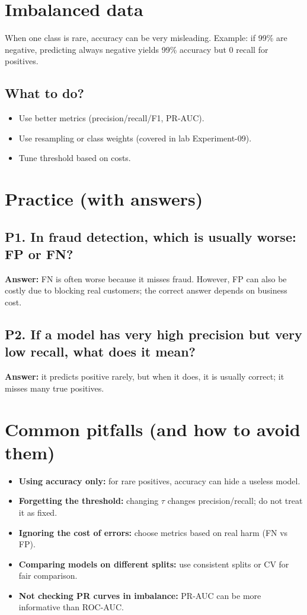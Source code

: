 \documentclass[11pt]{article}
\begin{document}
\section{Imbalanced data}
When one class is rare, accuracy can be very misleading.
Example: if 99\% are negative, predicting always negative yields 99\% accuracy but 0 recall for positives.

\subsection{What to do?}
\begin{itemize}[leftmargin=*]
  \item Use better metrics (precision/recall/F1, PR-AUC).
  \item Use resampling or class weights (covered in lab Experiment-09).
  \item Tune threshold based on costs.
\end{itemize}

\section{Practice (with answers)}
\subsection*{P1. In fraud detection, which is usually worse: FP or FN?}
\textbf{Answer:} FN is often worse because it misses fraud. However, FP can also be costly due to blocking real customers; the correct answer depends on business cost.

\subsection*{P2. If a model has very high precision but very low recall, what does it mean?}
\textbf{Answer:} it predicts positive rarely, but when it does, it is usually correct; it misses many true positives.

\section{Common pitfalls (and how to avoid them)}
\begin{itemize}[leftmargin=*]
  \item \textbf{Using accuracy only:} for rare positives, accuracy can hide a useless model.
  \item \textbf{Forgetting the threshold:} changing $\tau$ changes precision/recall; do not treat it as fixed.
  \item \textbf{Ignoring the cost of errors:} choose metrics based on real harm (FN vs FP).
  \item \textbf{Comparing models on different splits:} use consistent splits or CV for fair comparison.
  \item \textbf{Not checking PR curves in imbalance:} PR-AUC can be more informative than ROC-AUC.
\end{itemize}
\end{document}

